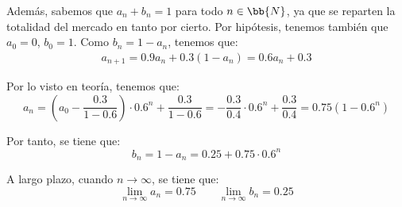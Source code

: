 \begin{ejercicio}
    Además, sabemos que $a_n+b_n=1$ para todo $n\in \bb{N}$, ya que se reparten la totalidad del mercado en tanto por cierto. Por hipótesis, tenemos también que $a_0=0$, $b_0=1$. Como $b_n=1-a_n$, tenemos que:
    \begin{align*}
        a_{n+1} = 0.9a_n + 0.3(1-a_n) = 0.6a_n + 0.3
    \end{align*}

    Por lo visto en teoría, tenemos que:
    \begin{equation*}
        a_n = \left(a_0-\frac{0.3}{1-0.6}\right)\cdot 0.6^n + \frac{0.3}{1-0.6}
        = -\frac{0.3}{0.4}\cdot 0.6^n + \frac{0.3}{0.4}
        = 0.75\left(1-0.6^n\right)
    \end{equation*}

    Por tanto, se tiene que:
    \begin{equation*}
        b_n = 1-a_n = 0.25 + 0.75\cdot 0.6^n
    \end{equation*}

    A largo plazo, cuando $n\to \infty$, se tiene que:
    \begin{equation*}
        \lim_{n\to \infty} a_n = 0.75
        \qquad 
        \lim_{n\to \infty} b_n = 0.25
    \end{equation*}
\end{ejercicio}


